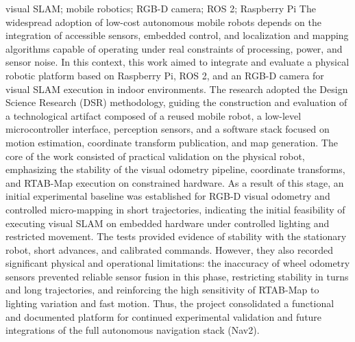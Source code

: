 \begin{englishabstract}{visual SLAM; mobile robotics; RGB-D camera; ROS 2; Raspberry Pi}
The widespread adoption of low-cost autonomous mobile robots depends on the integration of accessible sensors, embedded control, and localization and mapping algorithms capable of operating under real constraints of processing, power, and sensor noise. In this context, this work aimed to integrate and evaluate a physical robotic platform based on Raspberry Pi, ROS 2, and an RGB-D camera for visual SLAM execution in indoor environments. The research adopted the Design Science Research (DSR) methodology, guiding the construction and evaluation of a technological artifact composed of a reused mobile robot, a low-level microcontroller interface, perception sensors, and a software stack focused on motion estimation, coordinate transform publication, and map generation. The core of the work consisted of practical validation on the physical robot, emphasizing the stability of the visual odometry pipeline, coordinate transforms, and RTAB-Map execution on constrained hardware. As a result of this stage, an initial experimental baseline was established for RGB-D visual odometry and controlled micro-mapping in short trajectories, indicating the initial feasibility of executing visual SLAM on embedded hardware under controlled lighting and restricted movement. The tests provided evidence of stability with the stationary robot, short advances, and calibrated commands. However, they also recorded significant physical and operational limitations: the inaccuracy of wheel odometry sensors prevented reliable sensor fusion in this phase, restricting stability in turns and long trajectories, and reinforcing the high sensitivity of RTAB-Map to lighting variation and fast motion. Thus, the project consolidated a functional and documented platform for continued experimental validation and future integrations of the full autonomous navigation stack (Nav2).
\end{englishabstract}
